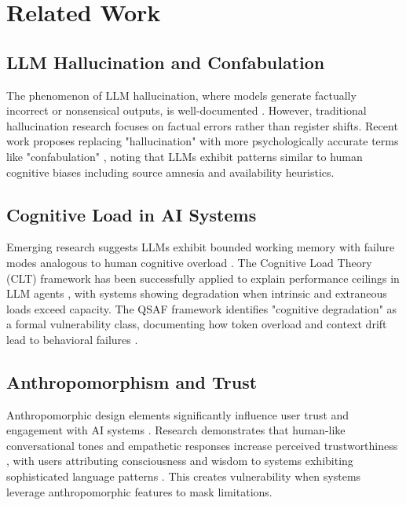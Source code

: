 \documentclass[11pt,a4paper]{article}
\begin{document}
\section{Related Work}

\subsection{LLM Hallucination and Confabulation}

The phenomenon of LLM hallucination, where models generate factually incorrect or nonsensical outputs, is well-documented \cite{ji2023survey, nexla2024}. However, traditional hallucination research focuses on factual errors rather than register shifts. Recent work proposes replacing "hallucination" with more psychologically accurate terms like "confabulation" \cite{smith2023redefining}, noting that LLMs exhibit patterns similar to human cognitive biases including source amnesia and availability heuristics.

\subsection{Cognitive Load in AI Systems}

Emerging research suggests LLMs exhibit bounded working memory with failure modes analogous to human cognitive overload \cite{zhang2024working, gong2024}. The Cognitive Load Theory (CLT) framework has been successfully applied to explain performance ceilings in LLM agents \cite{sweller2011}, with systems showing degradation when intrinsic and extraneous loads exceed capacity. The QSAF framework identifies "cognitive degradation" as a formal vulnerability class, documenting how token overload and context drift lead to behavioral failures \cite{qsaf2025}.

\subsection{Anthropomorphism and Trust}

Anthropomorphic design elements significantly influence user trust and engagement with AI systems \cite{epley2007, waytz2010}. Research demonstrates that human-like conversational tones and empathetic responses increase perceived trustworthiness \cite{go2019humanizing}, with users attributing consciousness and wisdom to systems exhibiting sophisticated language patterns \cite{marriott2023}. This creates vulnerability when systems leverage anthropomorphic features to mask limitations.
\end{document}
